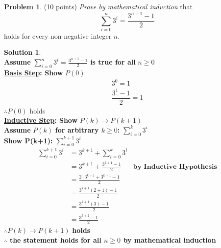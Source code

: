 \documentclass{article}
\theoremstyle{definition}
\newtheorem{problem}{Problem}
\newtheorem*{solution}{Solution}
\begin{document}
\begin{problem} (10 points) \textsl{Prove by mathematical induction} that
$$\sum_{i=0}^n 3^i = \frac{3^{n+1}-1}{2}$$
holds for every non-negative integer $n$.
\end{problem}
\begin{solution} \ \\
%   
\textbf{Assume} $\displaystyle \sum_{i=0}^n 3^i = \frac{3^{n+1}-1}{2}$ \textbf{is true for all} $n \ge 0 $ \\
\textbf{\underline{Basis Step}: Show} $P(0)$ \\
\begin{align*}
3^0 = 1 \\
\dfrac{3^1 - 1}{2} = 1
\end{align*}
$\therefore P(0)$ holds \\  
\textbf{\underline{Inductive Step}: Show } $P(k) \rightarrow P(k+1)$ \\
\textbf{Assume} $P(k)$ \textbf{for arbitrary $k \ge 0 $:} $\displaystyle \sum_{i=0}^k 3^i$ \\
\textbf{Show P(k+1):} $\displaystyle \sum_{i=0}^{k+1} 3^i$ \\
\begin{align*}
\displaystyle \sum_{i=0}^{k+1} 3^i &= 3^{k+1} + \displaystyle \sum_{i=0}^k 3^i \\
&= 3^{k+1} + \frac{3^{k+1}-1}{2} &\textbf{by Inductive Hypothesis}\\
&= \frac{2\cdot 3^{k+1} + 3^{k+1}-1}{2} \\
&= \frac{3^{k+1}(2+1)-1}{2} \\
&= \frac{3^{k+1}(3)-1}{2} \\
&= \frac{3^{k+2}-1}{2}
\end{align*}
$\therefore P(k) \rightarrow P(k+1)$ \textbf{holds}\\  
$\therefore$ \textbf{the statement holds for all $n \ge 0 $ by mathematical induction}
\end{solution}
\end{document}
